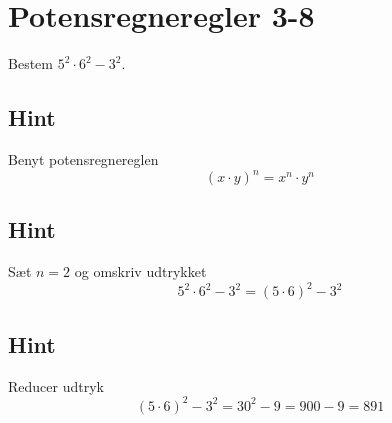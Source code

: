 \documentclass{article}
\newenvironment{exercise}[1]{\newpage\section{#1}}{}
\newcommand{\answerbox}[1]{\fbox{$#1$}}
\newcommand{\hint}{\subsection*{Hint}}
\begin{document}
\newpage

\begin{exercise}{Potensregneregler 3-8}
	
	Bestem $5^2 \cdot 6^2 - 3^2$.
	
	\answerbox{891}
	
	\hint
	
	Benyt potensregnereglen
	\[
	(x \cdot y)^n = x^n \cdot y^n
	\]
	
	\hint
	
	Sæt $n=2$ og omskriv udtrykket
	\[
	5^2 \cdot 6^2 - 3^2 = (5 \cdot 6)^2 - 3^2
	\]
	
	\hint
	
	Reducer udtryk
	\[
	(5 \cdot 6)^2 - 3^2 = 30^2 - 9 = 900-9 = 891
	\]
	
	
\end{exercise}
 
\end{document}
